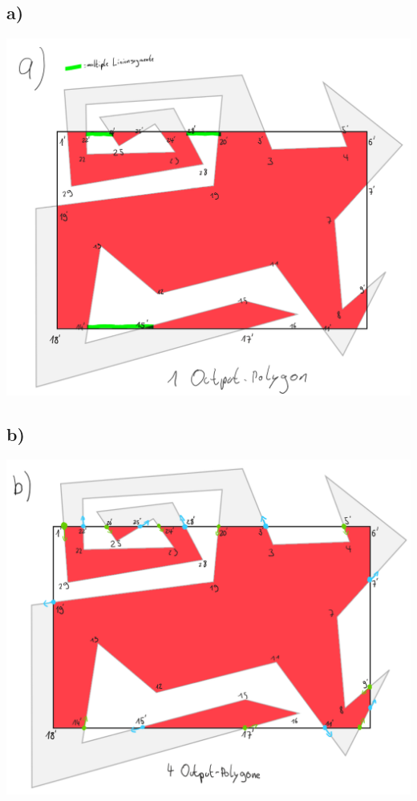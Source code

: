 \documentclass{article}
\begin{document}
\subsection*{a)}
\includegraphics[width=400pt]{./files/Übung10.2a.png}

\subsection*{b)}
\includegraphics[width=400pt]{./files/Übung10.2b.png}
\end{document}
